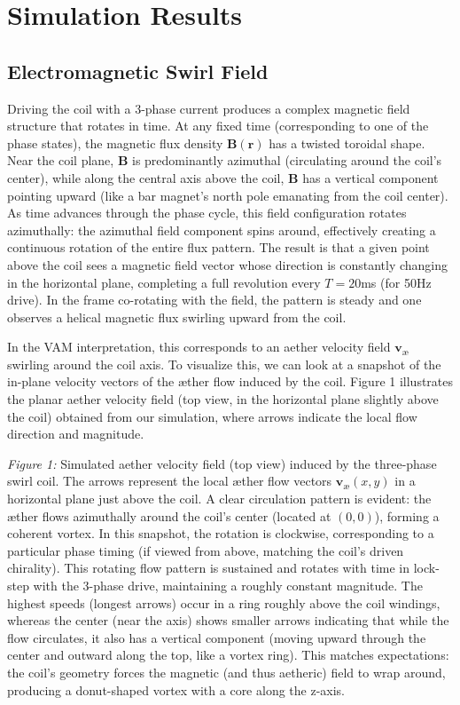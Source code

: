 \documentclass[twocolumn,aps,pre,floatfix,nofootinbib]{revtex4-2}
\begin{document}
\section{Simulation Results}

\subsection*{Electromagnetic Swirl Field}

Driving the coil with a 3-phase current produces a complex magnetic field structure that rotates in time. At any fixed time (corresponding to one of the phase states), the magnetic flux density $\mathbf{B}(\mathbf{r})$ has a twisted toroidal shape. Near the coil plane, $\mathbf{B}$ is predominantly azimuthal (circulating around the coil’s center), while along the central axis above the coil, $\mathbf{B}$ has a vertical component pointing upward (like a bar magnet’s north pole emanating from the coil center). As time advances through the phase cycle, this field configuration rotates azimuthally: the azimuthal field component spins around, effectively creating a continuous rotation of the entire flux pattern. The result is that a given point above the coil sees a magnetic field vector whose direction is constantly changing in the horizontal plane, completing a full revolution every $T=20$ms (for 50Hz drive). In the frame co-rotating with the field, the pattern is steady and one observes a helical magnetic flux swirling upward from the coil.


In the VAM interpretation, this corresponds to an aether velocity field $\mathbf{v}_{\text{æ}}$ swirling around the coil axis. To visualize this, we can look at a snapshot of the in-plane velocity vectors of the æther flow induced by the coil. Figure 1 illustrates the planar aether velocity field (top view, in the horizontal plane slightly above the coil) obtained from our simulation, where arrows indicate the local flow direction and magnitude.




\textit{Figure 1:} Simulated aether velocity field (top view) induced by the three-phase swirl coil. The arrows represent the local æther flow vectors $\mathbf{v}_{\text{æ}}(x,y)$ in a horizontal plane just above the coil. A clear circulation pattern is evident: the æther flows azimuthally around the coil's center (located at $(0,0)$), forming a coherent vortex. In this snapshot, the rotation is clockwise, corresponding to a particular phase timing (if viewed from above, matching the coil’s driven chirality). This rotating flow pattern is sustained and rotates with time in lock-step with the 3-phase drive, maintaining a roughly constant magnitude. The highest speeds (longest arrows) occur in a ring roughly above the coil windings, whereas the center (near the axis) shows smaller arrows indicating that while the flow circulates, it also has a vertical component (moving upward through the center and outward along the top, like a vortex ring). This matches expectations: the coil’s geometry forces the magnetic (and thus aetheric) field to wrap around, producing a donut-shaped vortex with a core along the z-axis.
\end{document}
